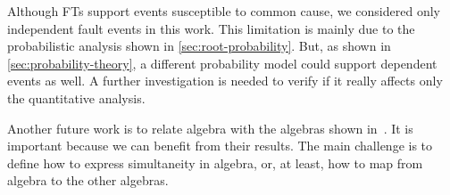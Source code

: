 Although \acp{FT} support events susceptible to common cause, we considered only independent fault events in this work.
This limitation is mainly due to the probabilistic analysis shown in \cref{sec:root-probability}.
But, as shown in \cref{sec:probability-theory}, a different probability model could support dependent events as well.
A further investigation is needed to verify if it really affects only the quantitative analysis.

Another future work is to relate \ac{algebra} with the algebras shown in~\cite{Merle2010,Walker2009}.
It is important because we can benefit from their results.
The main challenge is to define how to express simultaneity in \ac{algebra}, or, at least, how to map from \ac{algebra} to the other algebras.







